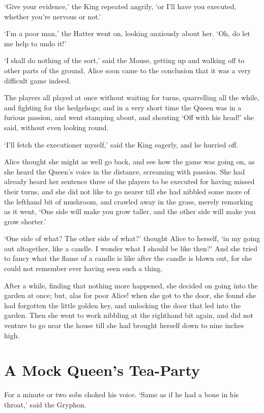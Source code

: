 \documentclass[statementpaper,twoside,openany]{memoir}
\begin{document}
`Give your evidence,' the King repeated angrily, `or I'll have you executed, whether you're nervous or not.'

`I'm a poor man,' the Hatter went on, looking anxiously about her. `Oh, do let me help to undo it!'

`I shall do nothing of the sort,' said the Mouse, getting up and walking off to other parts of the ground, Alice soon came to the conclusion that it was a very difficult game indeed.

The players all played at once without waiting for turns, quarrelling all the while, and fighting for the hedgehogs; and in a very short time the Queen was in a furious passion, and went stamping about, and shouting `Off with his head!' she said, without even looking round.

`I'll fetch the executioner myself,' said the King eagerly, and he hurried off.

Alice thought she might as well go back, and see how the game was going on, as she heard the Queen's voice in the distance, screaming with passion. She had already heard her sentence three of the players to be executed for having missed their turns, and she did not like to go nearer till she had nibbled some more of the lefthand bit of mushroom, and crawled away in the grass, merely remarking as it went, `One side will make you grow taller, and the other side will make you grow shorter.'

`One side of what? The other side of what?' thought Alice to herself, `in my going out altogether, like a candle. I wonder what I should be like then?' And she tried to fancy what the flame of a candle is like after the candle is blown out, for she could not remember ever having seen such a thing.

After a while, finding that nothing more happened, she decided on going into the garden at once; but, alas for poor Alice! when she got to the door, she found she had forgotten the little golden key, and unlocking the door that led into the garden. Then she went to work nibbling at the righthand bit again, and did not venture to go near the house till she had brought herself down to nine inches high.

\chapter{A Mock Queen's Tea-Party}

For a minute or two sobs choked his voice. `Same as if he had a bone in his throat,' said the Gryphon.
\end{document}

